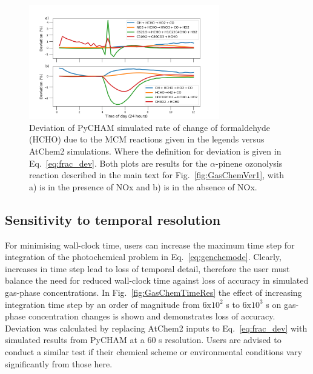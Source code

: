\documentclass[gmd, manuscript]{copernicus}
\begin{document}
\begin{figure}[t]
\includegraphics[width=8.3cm]{Results/photo_chem_grad_dev.png}
\caption{Deviation of PyCHAM simulated rate of change of formaldehyde (HCHO) due to the MCM reactions given in the legends versus AtChem2 simulations.  Where the definition for deviation is given in Eq.~\ref{eq:frac_dev}.  Both plots are results for the $\alpha$-pinene ozonolysis reaction described in the main text for Fig.~\ref{fig:GasChemVer1}, with a) is in the presence of NOx and b) is in the absence of NOx.}
\label{fig:GasChemVer2}
\end{figure}


\subsection{Sensitivity to temporal resolution}

For minimising wall-clock time, users can increase the maximum time step for integration of the photochemical problem in Eq.~\ref{eq:genchemode}.  Clearly, increases in time step lead to loss of temporal detail, therefore the user must balance the need for reduced wall-clock time against loss of accuracy in simulated gas-phase concentrations.  In Fig.~\ref{fig:GasChemTimeRes} the effect of increasing integration time step by an order of magnitude from $\mathrm{6x10^2}$ s to $\mathrm{6x10^3}$ s on gas-phase concentration changes is shown and demonstrates loss of accuracy.  Deviation was calculated by replacing AtChem2 inputs to Eq.~\ref{eq:frac_dev} with simulated results from PyCHAM at a 60 s resolution.  Users are advised to conduct a similar test if their chemical scheme or environmental conditions vary significantly from those here.
\end{document}
